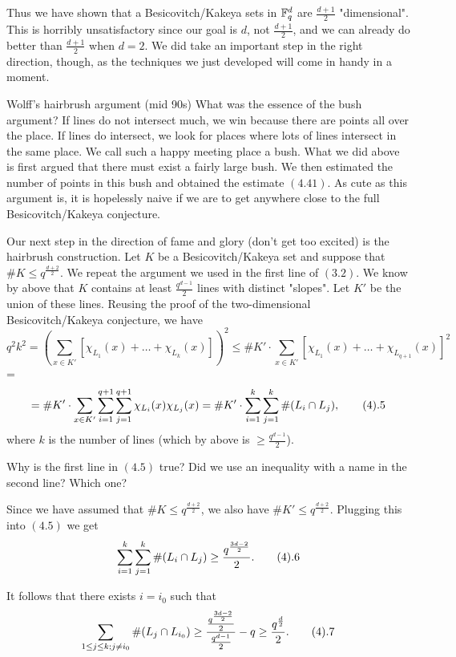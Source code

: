 Thus we have shown that a Besicovitch/Kakeya sets in ${\Bbb F}_q^d$ are
$\frac{d+1}{2}$ "dimensional". This is horribly unsatisfactory since our
goal is $d$, not $\frac{d+1}{2}$, and we can already do better than
$\frac{d+1}{2}$ when $d=2$. We did take an important step in the right
direction, though, as the techniques we just developed will come in handy
in a moment.

\subhead Wolff's hairbrush argument (mid 90s) \endsubhead What was the
essence of the bush argument? If lines do not intersect much, we win
because there are points all over the place. If lines do intersect, we
look for places where lots of lines intersect in the same place. We call
such a happy meeting place a bush. What we did above is first argued that
there must exist a fairly large bush. We then estimated the number of
points in this bush and obtained the estimate $(4.41)$. As cute as this
argument is, it is hopelessly naive if we are to get anywhere close to
the full Besicovitch/Kakeya conjecture.

Our next step in the direction of fame and glory (don't get too excited)
is the hairbrush construction. Let $K$ be a Besicovitch/Kakeya set and
suppose that $\# K
\leq q^{\frac{d+2}{2}}$. We repeat the argument we used in the first line
of $(3.2)$. We know by above that $K$ contains at least
$\frac{q^{d-1}}{2}$ lines with distinct "slopes". Let $K'$ be the union of
these lines. Reusing the proof of the two-dimensional Besicovitch/Kakeya
conjecture, we have
$$ q^2 k^2={\left( \sum_{x \in K'}
[\chi_{L_1}(x)+\dots+\chi_{L_k}(x)] \right)}^2 \leq \# K' \cdot \sum_{x
\in K'} {[\chi_{L_1}(x)+\dots+\chi_{L_{q+1}}(x)]}^2$$=$$ =\# K'
\cdot \sum_{x \in K'} \sum_{i=1}^{q+1} \sum_{j=1}^{q+1}
\chi_{L_i}(x)\chi_{L_j}(x)=\# K' \cdot \sum_{i=1}^k \sum_{j=1}^k \# (L_i
\cap L_j), \tag4.5$$ where $k$ is the number of lines (which by above is
$\ge \frac{q^{d-1}}{2}$).

 Why is the first line in $(4.5)$ true? Did we use
an inequality with a name in the second line? Which one? \endproclaim

Since we have assumed that $\# K \leq q^{\frac{d+2}{2}}$, we also have
$\# K' \leq q^{\frac{d+2}{2}}$. Plugging this into $(4.5)$ we get
$$ \sum_{i=1}^k \sum_{j=1}^k \# (L_i \cap L_j) \ge
\frac{q^{\frac{3d-2}{2}}}{2}. \tag4.6$$

It follows that there exists $i=i_0$ such that
$$ \sum_{1 \leq j \leq k; j \not=i_0} \# (L_j \cap L_{i_0}) \ge
\frac{\frac{q^{\frac{3d-2}{2}}}{2}}{\frac{q^{d-1}}{2}}-q \ge
\frac{q^{\frac{d}{2}}}{2}. \tag4.7$$

